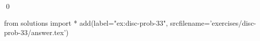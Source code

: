 
\begin{ex} 
  \label{ex:disc-prob-33}
  
  \qed
\end{ex} 
\begin{python0}
from solutions import *
add(label="ex:disc-prob-33",
    srcfilename='exercises/disc-prob-33/answer.tex') 
\end{python0}
